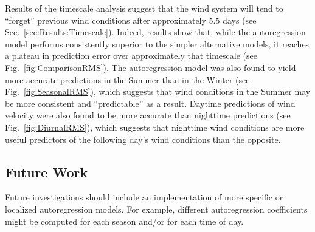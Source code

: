 \documentclass[11pt, oneside]{article}
\newcommand{\figref}[1]{Fig.~\ref{#1}}
\newcommand{\secref}[1]{Sec.~\ref{#1}}
\begin{document}
Results of the timescale analysis suggest that the wind system will tend to ``forget'' previous wind conditions after approximately 5.5 days (see \secref{sec:Results:Timescale}).
Indeed, results show that, while the autoregression model performs consistently superior to the simpler alternative models, it reaches a plateau in prediction error over approximately that timescale (see \figref{fig:ComparisonRMS}).
The autoregression model was also found to yield more accurate predictions in the Summer than in the Winter (see \figref{fig:SeasonalRMS}), which suggests that wind conditions in the Summer may be more consistent and ``predictable'' as a result.
Daytime predictions of wind velocity were also found to be more accurate than nighttime predictions (see \figref{fig:DiurnalRMS}), which suggests that nighttime wind conditions are more useful predictors of the following day's wind conditions than the opposite.

\subsection{Future Work}
Future investigations should include an implementation of more specific or localized autoregression models.
For example, different autoregression coefficients might be computed for each season and/or for each time of day.



\end{document}
